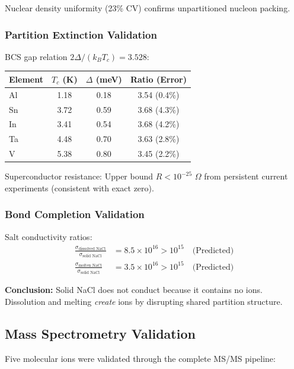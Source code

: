 \documentclass[twocolumn,10pt,a4paper]{article}
\theoremstyle{definition}
\theoremstyle{remark}
\begin{document}
Nuclear density uniformity (23\% CV) confirms unpartitioned nucleon packing.

\subsubsection{Partition Extinction Validation}

BCS gap relation $2\Delta/(k_B T_c) = 3.528$:

\begin{center}
\begin{tabular}{lccc}
\toprule
Element & $T_c$ (K) & $\Delta$ (meV) & Ratio (Error) \\
\midrule
Al & 1.18 & 0.18 & 3.54 (0.4\%) \\
Sn & 3.72 & 0.59 & 3.68 (4.3\%) \\
In & 3.41 & 0.54 & 3.68 (4.2\%) \\
Ta & 4.48 & 0.70 & 3.63 (2.8\%) \\
V & 5.38 & 0.80 & 3.45 (2.2\%) \\
\bottomrule
\end{tabular}
\end{center}

Superconductor resistance: Upper bound $R < 10^{-25}$ $\Omega$ from persistent current experiments (consistent with exact zero).

\subsubsection{Bond Completion Validation}

Salt conductivity ratios:
\begin{align}
    \frac{\sigma_{\text{dissolved NaCl}}}{\sigma_{\text{solid NaCl}}} &= 8.5 \times 10^{16} > 10^{15} \quad \text{(Predicted)} \\
    \frac{\sigma_{\text{molten NaCl}}}{\sigma_{\text{solid NaCl}}} &= 3.5 \times 10^{16} > 10^{15} \quad \text{(Predicted)}
\end{align}

\textbf{Conclusion:} Solid NaCl does not conduct because it contains no ions. Dissolution and melting \emph{create} ions by disrupting shared partition structure.

\subsection{Mass Spectrometry Validation}

Five molecular ions were validated through the complete MS/MS pipeline:
\end{document}
